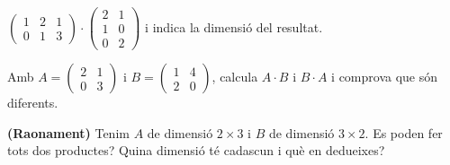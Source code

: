 \begin{exercicis}
\begin{exlist}
        $\begin{pmatrix} 1 & 2 & 1 \\ 0 & 1 & 3 \end{pmatrix}\cdot\begin{pmatrix} 2 & 1 \\ 1 & 0 \\ 0 & 2 \end{pmatrix}$
        i indica la dimensió del resultat.
  \item Amb $A=\begin{pmatrix} 2 & 1 \\ 0 & 3 \end{pmatrix}$ i
        $B=\begin{pmatrix} 1 & 4 \\ 2 & 0 \end{pmatrix}$, calcula $A\cdot B$ i
        $B\cdot A$ i comprova que són diferents.
  \item \textbf{(Raonament)} Tenim $A$ de dimensió $2\times 3$ i $B$ de dimensió
        $3\times 2$. Es poden fer tots dos productes? Quina dimensió té cadascun i
        què en dedueixes?
\end{exlist}
\end{exercicis}

